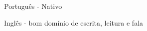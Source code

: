 
\begin{cventries}
  \cventry
  {}
  {
    \begin{cvitems} %
      \item {Português - Nativo}
      \item {Inglês - bom domínio de escrita, leitura e fala}
    \end{cvitems}
  }
  {} {} {}

\end{cventries}